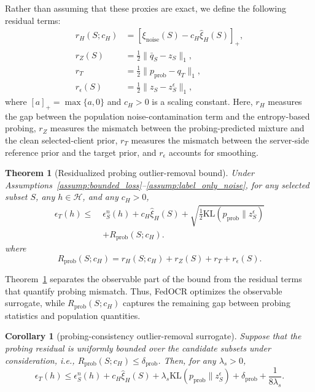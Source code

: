 ﻿\documentclass[conference]{IEEEtran}
\newtheorem{theorem}{Theorem}
\newtheorem{corollary}{Corollary}
\theoremstyle{definition}
\theoremstyle{remark}
\begin{document}
Rather than assuming that these proxies are exact, we define the following residual terms:
\begin{align}
\label{eq:entropy_residual}
r_H(S;c_H)
&=
\left[
\xi_{\mathrm{noise}}(S)
-
c_H\widehat{\xi}_{H}(S)
\right]_+,\\
\label{eq:coverage_residual}
r_Z(S)
&=
\frac12\|\bar q_S-z_S\|_1,\\
\label{eq:target_probing_residual}
r_T
&=
\frac12\|p_{\mathrm{prob}}-q_T\|_1,\\
\label{eq:smoothing_residual}
r_\epsilon(S)
&=
\frac12\|z_S-z_S^\epsilon\|_1,
\end{align}
where $[a]_+=\max\{a,0\}$ and $c_H>0$ is a scaling constant.
Here, $r_H$ measures the gap between the population noise-contamination term and the entropy-based probing, $r_Z$ measures the mismatch between the probing-predicted mixture and the clean selected-client prior, $r_T$ measures the mismatch between the server-side reference prior and the target prior, and $r_\epsilon$ accounts for smoothing.

\begin{theorem}[Residualized probing outlier-removal bound]
\label{thm:residualized_probing_bound}
Under Assumptions~\ref{assump:bounded_loss}--\ref{assump:label_only_noise}, for any selected subset $S$, any $h\in\mathcal H$, and any $c_H>0$,
\begin{equation}
	\label{eq:residualized_probing_bound}
	\begin{aligned}
		\epsilon_T(h)
		\le\;&
		\epsilon_S^n(h)
		+
		c_H\widehat{\xi}_{H}(S)
		+
		\sqrt{
			\frac12
			\mathrm{KL}
			\left(
			p_{\mathrm{prob}}\|z_S^\epsilon
			\right)
		}
		\\
		&+
		R_{\mathrm{prob}}(S;c_H).
	\end{aligned}
\end{equation}
where
\begin{equation}
\label{eq:probing_residual_total}
R_{\mathrm{prob}}(S;c_H)
=
r_H(S;c_H)
+
r_Z(S)
+
r_T
+
r_\epsilon(S).
\end{equation}
\end{theorem}

Theorem~\ref{thm:residualized_probing_bound} separates the observable part of the bound from the residual terms that quantify probing mismatch.
Thus, FedOCR optimizes the observable surrogate, while $R_{\mathrm{prob}}(S;c_H)$ captures the remaining gap between probing statistics and population quantities.

\begin{corollary}[probing-consistency outlier-removal surrogate]
\label{cor:probing_consistency_surrogate}
Suppose that the probing residual is uniformly bounded over the candidate subsets under consideration, i.e.,
$R_{\mathrm{prob}}(S;c_H)\le \delta_{\mathrm{prob}}$.
Then, for any $\lambda_s>0$,
\begin{equation}
\label{eq:probing_consistency_bound}
\epsilon_T(h)
\le
\epsilon_S^n(h)
+
c_H\widehat{\xi}_{H}(S)
+
\lambda_s
\mathrm{KL}
\left(
p_{\mathrm{prob}}\|z_S^\epsilon
\right)
+
\delta_{\mathrm{prob}}
+
\frac{1}{8\lambda_s}.
\end{equation}
\end{corollary}
\end{document}
